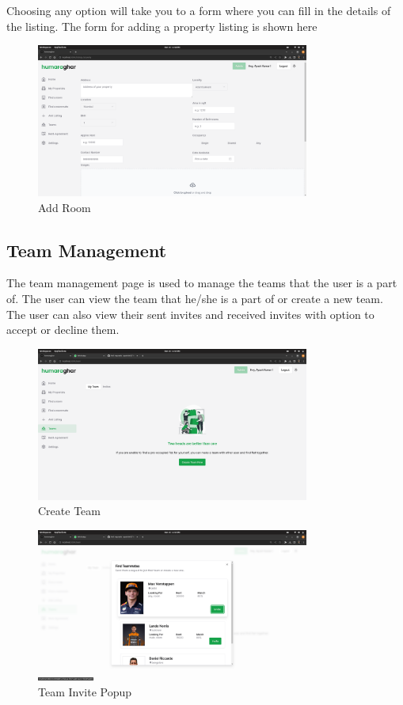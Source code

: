 \noindent Choosing any option will take you to a form where you can fill in the details of the listing.
The form for adding a property listing is shown here \par
\begin{figure}[h]
    \centering
    \includegraphics[width=0.8\textwidth]{Images/screenshots/proplisting.png}
    \caption{Add Room}
\end{figure}

\clearpage

\subsection{Team Management}
The team management page is used to manage the teams that the user is a part of. The user can view the team that he/she is a part of or create a new team. The user can also view their sent invites and received invites
with option to accept or decline them.
\begin{figure}[h]
    \centering
    \includegraphics[width=0.8\textwidth]{Images/screenshots/createteam.png}
    \caption{Create Team}
\end{figure}

\begin{figure}[h]
    \centering
    \includegraphics[width=0.8\textwidth]{Images/screenshots/teampopup.png}
    \caption{Team Invite Popup}
\end{figure}


